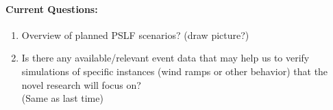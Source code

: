 \documentclass[12pt]{article}
\begin{document}
	\paragraph{Current Questions:}
	\begin{enumerate}
		
		
		\item Overview of planned PSLF scenarios? (draw picture?)
		
		\item Is there any available/relevant event data that may help us to verify simulations of specific instances (wind ramps or other behavior) that the novel research will focus on?\\ (Same as last time)
	\end{enumerate}

\pagebreak
\end{document}
